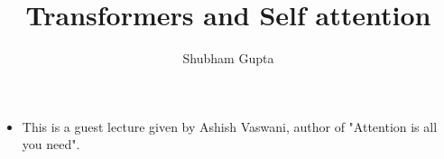 \documentclass[a4paper]{article}
\title{Transformers and Self attention}
\author{Shubham Gupta}
\begin{document}
\maketitle
\begin{itemize}
    \item This is a guest lecture given by Ashish Vaswani, author of "Attention is all you need".
\end{itemize}
\end{document}
